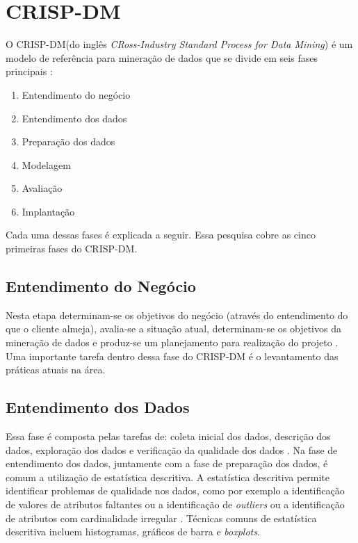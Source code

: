 \section{CRISP-DM}
O \acrshort{CRISP-DM}(do inglês \textit{CRoss-Industry Standard Process for Data Mining}) é um
modelo de referência para mineração de dados que se divide em seis fases principais
\cite{crispdm}:
\begin{enumerate}
    \item Entendimento do negócio
    \item Entendimento dos dados
    \item Preparação dos dados
    \item Modelagem
    \item Avaliação
    \item Implantação
\end{enumerate}
Cada uma dessas fases é explicada a seguir. Essa pesquisa cobre as cinco primeiras
fases do CRISP-DM. 

\subsection{Entendimento do Negócio}
Nesta etapa determinam-se os objetivos do negócio (através do entendimento do que o cliente
almeja), avalia-se a situação atual, determinam-se os objetivos da mineração de dados
e produz-se um planejamento para realização do projeto \cite{crispdm}. Uma importante
tarefa dentro dessa fase do CRISP-DM é o levantamento das práticas atuais na área.  

\subsection{Entendimento dos Dados}
Essa fase é composta pelas tarefas de: coleta inicial dos dados, descrição dos dados,
exploração dos dados e verificação da qualidade dos dados \cite{crispdm}.
Na fase de entendimento dos dados, juntamente com a fase de preparação dos dados, 
é comum a utilização de estatística descritiva. A
estatística descritiva permite identificar problemas de qualidade nos dados, como por
exemplo a identificação de valores de atributos faltantes ou a identificação de
\textit{outliers} ou a identificação de atributos com cardinalidade irregular
\cite{ml_book}. Técnicas comuns de estatística descritiva incluem histogramas,
gráficos de barra e \textit{boxplots}. 

